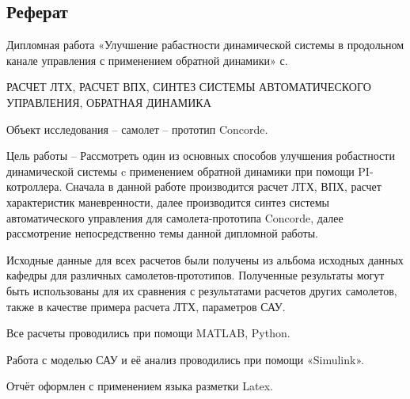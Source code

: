 
\newpage
\begin{center}
    \section*{Реферат}
\end{center}
\pagestyle{fancy}
\fancyhf{}
\rfoot{\thepage}
Дипломная работа «Улучшение рабастности динамической системы в продольном канале управления с применением обратной динамики» \pageref{LastPage} с.

РАСЧЕТ ЛТХ, РАСЧЕТ ВПХ, СИНТЕЗ СИСТЕМЫ АВТОМАТИЧЕСКОГО
УПРАВЛЕНИЯ, ОБРАТНАЯ ДИНАМИКА

Объект исследования -- самолет -- прототип Concorde.

Цель работы -- Рассмотреть один из основных способов улучшения робастности динамической системы c применением обратной динамики при помощи PI-котроллера. Сначала в данной работе производится расчет ЛТХ, ВПХ, расчет
характеристик маневренности, далее производится синтез системы
автоматического управления для самолета-прототипа Concorde, далее
рассмотрение непосредственно темы данной дипломной работы.

Исходные данные для всех расчетов были получены из альбома исходных
данных кафедры для различных самолетов-прототипов.
Полученные результаты могут быть использованы для их сравнения с
результатами расчетов других самолетов, также в качестве примера расчета
ЛТХ, параметров САУ.

Все расчеты проводились при помощи MATLAB, Python. 

Работа с моделью САУ и её анализ проводились при помощи «Simulink». 

Отчёт оформлен с применением языка разметки Latex.
 